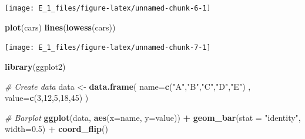\documentclass[10pt,]{krantz}
\newenvironment{Shaded}{\begin{snugshade}}{\end{snugshade}}
\newcommand{\CommentTok}[1]{\textcolor[rgb]{0.56,0.35,0.01}{\textit{#1}}}
\newcommand{\DataTypeTok}[1]{\textcolor[rgb]{0.13,0.29,0.53}{#1}}
\newcommand{\DecValTok}[1]{\textcolor[rgb]{0.00,0.00,0.81}{#1}}
\newcommand{\FloatTok}[1]{\textcolor[rgb]{0.00,0.00,0.81}{#1}}
\newcommand{\KeywordTok}[1]{\textcolor[rgb]{0.13,0.29,0.53}{\textbf{#1}}}
\newcommand{\NormalTok}[1]{#1}
\newcommand{\OperatorTok}[1]{\textcolor[rgb]{0.81,0.36,0.00}{\textbf{#1}}}
\newcommand{\OtherTok}[1]{\textcolor[rgb]{0.56,0.35,0.01}{#1}}
\newcommand{\StringTok}[1]{\textcolor[rgb]{0.31,0.60,0.02}{#1}}
\theoremstyle{definition}
\theoremstyle{definition}
\theoremstyle{definition}
\theoremstyle{definition}
\theoremstyle{remark}
\begin{document}
\begin{Shaded}
\end{Shaded}

\begin{center}\texttt{[image: E\_1\_files/figure-latex/unnamed-chunk-6-1]} \end{center}

\begin{Shaded}
\begin{Highlighting}[]
\KeywordTok{plot}\NormalTok{(cars)}
\KeywordTok{lines}\NormalTok{(}\KeywordTok{lowess}\NormalTok{(cars))}
\end{Highlighting}
\end{Shaded}

\begin{center}\texttt{[image: E\_1\_files/figure-latex/unnamed-chunk-7-1]} \end{center}

\begin{Shaded}
\begin{Highlighting}[]
\KeywordTok{library}\NormalTok{(ggplot2)}

\CommentTok{# Create data}
\NormalTok{data <-}\StringTok{ }\KeywordTok{data.frame}\NormalTok{(}
  \DataTypeTok{name=}\KeywordTok{c}\NormalTok{(}\StringTok{"A"}\NormalTok{,}\StringTok{"B"}\NormalTok{,}\StringTok{"C"}\NormalTok{,}\StringTok{"D"}\NormalTok{,}\StringTok{"E"}\NormalTok{) ,  }
  \DataTypeTok{value=}\KeywordTok{c}\NormalTok{(}\DecValTok{3}\NormalTok{,}\DecValTok{12}\NormalTok{,}\DecValTok{5}\NormalTok{,}\DecValTok{18}\NormalTok{,}\DecValTok{45}\NormalTok{)}
\NormalTok{  )}

\CommentTok{# Barplot}
\KeywordTok{ggplot}\NormalTok{(data, }\KeywordTok{aes}\NormalTok{(}\DataTypeTok{x=}\NormalTok{name, }\DataTypeTok{y=}\NormalTok{value)) }\OperatorTok{+}\StringTok{ }
\StringTok{  }\KeywordTok{geom_bar}\NormalTok{(}\DataTypeTok{stat =} \StringTok{"identity"}\NormalTok{, }\DataTypeTok{width=}\FloatTok{0.5}\NormalTok{) }\OperatorTok{+}
\StringTok{  }\KeywordTok{coord_flip}\NormalTok{()}
\end{Highlighting}
\end{Shaded}
\end{document}
